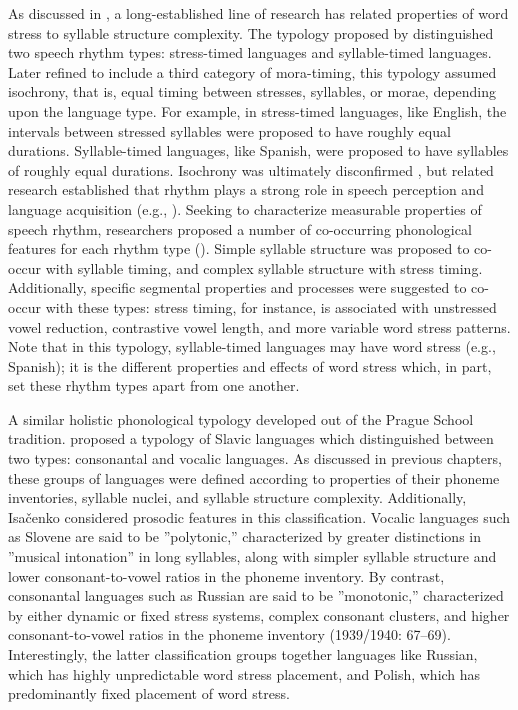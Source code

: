   As discussed in , a long-established line of research has related properties of word stress to syllable structure complexity. The typology proposed by \citet{Pike1945} distinguished two speech rhythm types: stress-timed languages and syllable-timed languages. Later refined to include a third category of mora-timing, this typology assumed isochrony, that is, equal timing between stresses, syllables, or morae, depending upon the language type. For example, in stress-timed languages, like English, the intervals between stressed syllables were proposed to have roughly equal durations. Syllable-timed languages, like Spanish, were proposed to have syllables of roughly equal durations. Isochrony was ultimately disconfirmed \citep{Roach1982}, but related research established that rhythm plays a strong role in speech perception and language acquisition (e.g., \citealt{CutlerMehler1993}). Seeking to characterize measurable properties of speech rhythm, researchers proposed a number of co-occurring phonological features for each rhythm type (\citealt{Dauer1983,Auer1993}). Simple syllable structure was proposed to co-occur with syllable timing, and complex syllable structure with stress timing. Additionally, specific segmental properties and processes were suggested to co-occur with these types: stress timing, for instance, is associated with unstressed vowel reduction, contrastive vowel length, and more variable word stress patterns. Note that in this typology, syllable-timed languages may have word stress (e.g., Spanish); it is the different properties and effects of word stress which, in part, set these rhythm types apart from one another.

  A similar holistic phonological typology developed out of the Prague School tradition. \citet{Isačenko1939/1940} proposed a typology of Slavic languages which distinguished between two types: consonantal and vocalic languages. As discussed in previous chapters, these groups of languages were defined according to properties of their phoneme inventories, syllable nuclei, and syllable structure complexity. Additionally, Isačenko considered prosodic features in this classification. Vocalic languages such as Slovene are said to be ”polytonic,” characterized by greater distinctions in ”musical intonation” in long syllables, along with simpler syllable structure and lower consonant-to-vowel ratios in the phoneme inventory. By contrast, consonantal languages such as Russian are said to be ”monotonic,” characterized by either dynamic or fixed stress systems, complex consonant clusters, and higher consonant-to-vowel ratios in the phoneme inventory (1939/1940: 67--69). Interestingly, the latter classification groups together languages like Russian, which has highly unpredictable word stress placement, and Polish, which has predominantly fixed placement of word stress.

